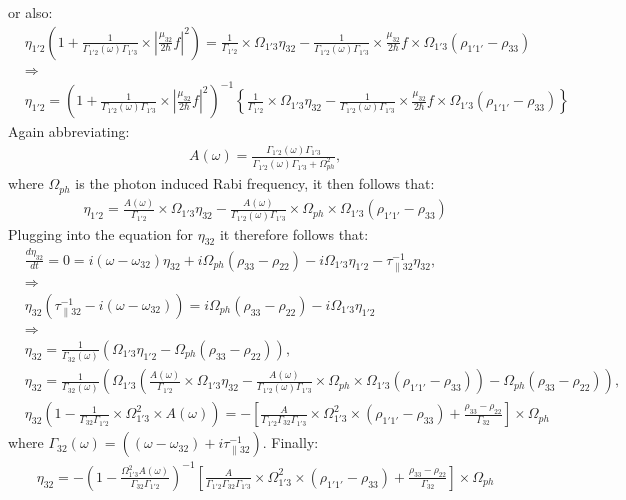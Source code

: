 \documentclass[10pt,letterpaper]{article}
\begin{document}
	or also:
	\begin{align}
	&\eta_{1'2}\left(1+\frac{1}{\Gamma_{1'2}(\omega)\Gamma_{1'3}}\times|\frac{\mu_{32}}{2 \hbar}f|^2 \right)=  \frac{1}{ \Gamma_{1'2} } \times \Omega_{1'3}\eta_{32} - \frac{1}{\Gamma_{1'2}(\omega)\Gamma_{1'3}}\times \frac{\mu_{32}}{2 \hbar}f\times \Omega_{1'3}(\rho_{1'1'} - \rho_{33}) \\ 
	&\Rightarrow \\
	&\eta_{1'2}= \left(1+\frac{1}{\Gamma_{1'2}(\omega)\Gamma_{1'3}}\times|\frac{\mu_{32}}{2 \hbar}f|^2 \right)^{-1} \left\{ \frac{1}{ \Gamma_{1'2} } \times \Omega_{1'3}\eta_{32} - \frac{1}{\Gamma_{1'2}(\omega)\Gamma_{1'3}}\times \frac{\mu_{32}}{2 \hbar}f\times \Omega_{1'3}(\rho_{1'1'} - \rho_{33})\right\} 
	\end{align}
	Again abbreviating:
	\begin{align}
	& A(\omega) = \frac{\Gamma_{1'2}(\omega)\Gamma_{1'3}}{\Gamma_{1'2}(\omega)\Gamma_{1'3}+\Omega_{ph}^2},
	\end{align}
	where $\Omega_{ph}$ is the photon induced Rabi frequency, it then follows that:
	\begin{align}
	&\eta_{1'2}=  \frac{A(\omega)}{ \Gamma_{1'2} } \times \Omega_{1'3}\eta_{32} - \frac{A(\omega)}{\Gamma_{1'2}(\omega)\Gamma_{1'3}}\times \Omega_{ph}\times \Omega_{1'3}(\rho_{1'1'} - \rho_{33})
	\end{align}
	Plugging into the equation for $\eta_{32}$ it therefore follows that:
	\begin{align}
	&\frac{d \eta_{32}}{d t}   = 0 = i(\omega - \omega_{32})\eta_{32} +i \Omega_{ph}(\rho_{33}-\rho_{22}) - i\Omega_{1'3}\eta_{1'2} - \tau_{\parallel 32}^{-1}\eta_{32}, \\
	&\Rightarrow \nonumber \\
	&\eta_{32} (\tau_{\parallel 32}^{-1}-i(\omega - \omega_{32})) = i\Omega_{ph}(\rho_{33}-\rho_{22}) - i\Omega_{1'3}\eta_{1'2} \\ 
	&\Rightarrow \nonumber \\
	&\eta_{32} = \frac{1}{\Gamma_{32}(\omega) }  \left(\Omega_{1'3}\eta_{1'2}-\Omega_{ph}(\rho_{33}-\rho_{22}) \right), \\ 
	&\eta_{32} = \frac{1}{\Gamma_{32}(\omega) }  \left(\Omega_{1'3}\left(\frac{A(\omega)}{ \Gamma_{1'2} } \times \Omega_{1'3}\eta_{32} - \frac{A(\omega)}{\Gamma_{1'2}(\omega)\Gamma_{1'3}}\times \Omega_{ph}\times \Omega_{1'3}(\rho_{1'1'} - \rho_{33})\right)-\Omega_{ph}(\rho_{33}-\rho_{22}) \right), \\ 
	&\eta_{32}(1-\frac{1}{\Gamma_{32}\Gamma_{1'2}}\times\Omega_{1'3}^2 \times A(\omega)) = -\left [ \frac{A}{\Gamma_{1'2}\Gamma_{32}\Gamma_{1'3}}\times \Omega_{1'3}^2\times(\rho_{1'1'}-\rho_{33}) +\frac{\rho_{33}-\rho_{22}}{\Gamma_{32}} \right]\times\Omega_{ph}
	\end{align}
	where $  \Gamma_{32}(\omega) = ((\omega - \omega_{32})+i\tau_{\parallel 32}^{-1}). $ Finally:
	\begin{align}
	&\eta_{32} =-(1-\frac{\Omega_{1'3}^2  A(\omega)}{\Gamma_{32}\Gamma_{1'2}})^{-1} \left [ \frac{A}{\Gamma_{1'2}\Gamma_{32}\Gamma_{1'3}}\times \Omega_{1'3}^2\times(\rho_{1'1'}-\rho_{33}) +\frac{\rho_{33}-\rho_{22}}{\Gamma_{32}} \right]\times\Omega_{ph}
	\end{align}
	
\end{document}
